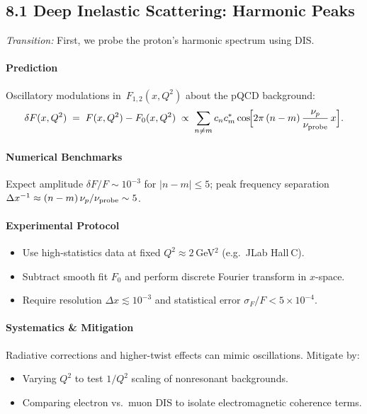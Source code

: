 \subsection{8.1 Deep Inelastic Scattering: Harmonic Peaks}  
\emph{Transition:} First, we probe the proton’s harmonic spectrum using DIS.

\paragraph{Prediction}  
Oscillatory modulations in 
\(\,F_{1,2}(x,Q^2)\) about the pQCD background:
\begin{equation}\label{eq:dis_mod}
\delta F(x,Q^2)\;=\;F(x,Q^2)-F_0(x,Q^2)
\;\propto\;\sum_{n\neq m}c_n c_m^* \cos\!\Bigl[2\pi\,(n-m)\,\frac{\nu_p}{\nu_{\rm probe}}\,x\Bigr].
\end{equation}

\paragraph{Numerical Benchmarks}  
Expect amplitude \(\delta F/F\sim10^{-3}\) for \(|n-m|\le5\); peak frequency separation \(\Delta x^{-1}\approx(n-m)\,\nu_p/\nu_{\rm probe}\sim5\).

\paragraph{Experimental Protocol}  
\begin{itemize}
  \item Use high-statistics data at fixed \(Q^2\approx2\) GeV\(^2\) (e.g.\ JLab Hall C).  
  \item Subtract smooth fit \(F_0\) and perform discrete Fourier transform in \(x\)-space.  
  \item Require resolution \(\Delta x\lesssim10^{-3}\) and statistical error \(\sigma_F/F<5\times10^{-4}\).
\end{itemize}

\paragraph{Systematics \& Mitigation}  
Radiative corrections and higher-twist effects can mimic oscillations.  Mitigate by:
\begin{itemize}
  \item Varying \(Q^2\) to test \(1/Q^2\) scaling of nonresonant backgrounds.  
  \item Comparing electron vs.\ muon DIS to isolate electromagnetic coherence terms.
\end{itemize}

